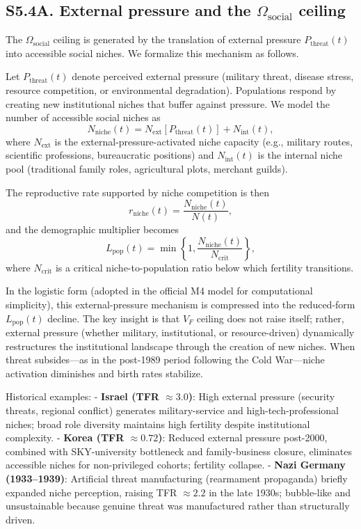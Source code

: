 \documentclass[11pt]{article}
\begin{document}
\subsection*{S5.4A. External pressure and the $\Omega_{\mathrm{social}}$ ceiling}

The $\Omega_{\mathrm{social}}$ ceiling is generated by the translation of external pressure $P_{\mathrm{threat}}(t)$ into accessible social niches. We formalize this mechanism as follows.

Let $P_{\mathrm{threat}}(t)$ denote perceived external pressure (military threat, disease stress, resource competition, or environmental degradation). Populations respond by creating new institutional niches that buffer against pressure. We model the number of accessible social niches as
\begin{equation}
N_{\mathrm{niche}}(t) = N_{\mathrm{ext}}\!\left[P_{\mathrm{threat}}(t)\right] + N_{\mathrm{int}}(t),
\end{equation}
where $N_{\mathrm{ext}}$ is the external-pressure-activated niche capacity (e.g., military routes, scientific professions, bureaucratic positions) and $N_{\mathrm{int}}(t)$ is the internal niche pool (traditional family roles, agricultural plots, merchant guilds).

The reproductive rate supported by niche competition is then
\begin{equation}
r_{\mathrm{niche}}(t) = \frac{N_{\mathrm{niche}}(t)}{N(t)},
\end{equation}
and the demographic multiplier becomes
\begin{equation}
L_{\mathrm{pop}}(t) = \min\left\{1, \frac{N_{\mathrm{niche}}(t)}{N_{\mathrm{crit}}}\right\},
\end{equation}
where $N_{\mathrm{crit}}$ is a critical niche-to-population ratio below which fertility transitions.

In the logistic form (adopted in the official M4 model for computational simplicity), this external-pressure mechanism is compressed into the reduced-form $L_{\mathrm{pop}}(t)$ decline. The key insight is that $V_F$ ceiling does not raise itself; rather, external pressure (whether military, institutional, or resource-driven) dynamically restructures the institutional landscape through the creation of new niches. When threat subsides---as in the post-1989 period following the Cold War---niche activation diminishes and birth rates stabilize.

Historical examples:
- \textbf{Israel (TFR $\approx 3.0$)}: High external pressure (security threats, regional conflict) generates military-service and high-tech-professional niches; broad role diversity maintains high fertility despite institutional complexity.
- \textbf{Korea (TFR $\approx 0.72$)}: Reduced external pressure post-2000, combined with SKY-university bottleneck and family-business closure, eliminates accessible niches for non-privileged cohorts; fertility collapse.
- \textbf{Nazi Germany (1933--1939)}: Artificial threat manufacturing (rearmament propaganda) briefly expanded niche perception, raising TFR $\approx 2.2$ in the late 1930s; bubble-like and unsustainable because genuine threat was manufactured rather than structurally driven.
\end{document}
